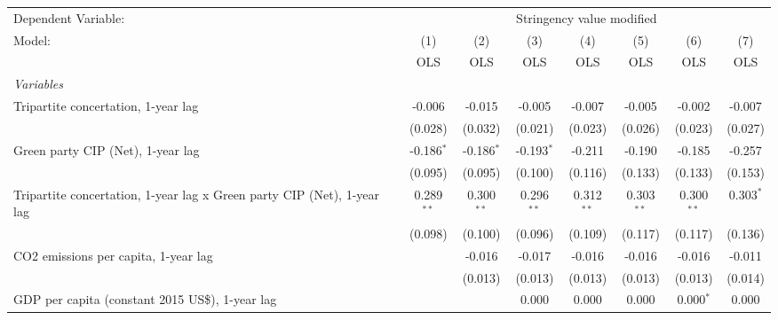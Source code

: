 
\begingroup
\centering
\begin{tabular}{lccccccc}
   \toprule
   Dependent Variable: & \multicolumn{7}{c}{Stringency value modified}\\
   Model:                                                                  & (1)          & (2)          & (3)          & (4)          & (5)          & (6)          & (7)\\  
                                                                           &  OLS         & OLS          & OLS          & OLS          & OLS          & OLS          & OLS\\  
   \midrule
   \emph{Variables}\\
   Tripartite concertation, 1-year lag                                     & -0.006       & -0.015       & -0.005       & -0.007       & -0.005       & -0.002       & -0.007\\   
                                                                           & (0.028)      & (0.032)      & (0.021)      & (0.023)      & (0.026)      & (0.023)      & (0.027)\\   
   Green party CIP (Net), 1-year lag                                       & -0.186$^{*}$ & -0.186$^{*}$ & -0.193$^{*}$ & -0.211       & -0.190       & -0.185       & -0.257\\   
                                                                           & (0.095)      & (0.095)      & (0.100)      & (0.116)      & (0.133)      & (0.133)      & (0.153)\\   
   Tripartite concertation, 1-year lag x Green party CIP (Net), 1-year lag & 0.289$^{**}$ & 0.300$^{**}$ & 0.296$^{**}$ & 0.312$^{**}$ & 0.303$^{**}$ & 0.300$^{**}$ & 0.303$^{*}$\\   
                                                                           & (0.098)      & (0.100)      & (0.096)      & (0.109)      & (0.117)      & (0.117)      & (0.136)\\   
   CO2 emissions per capita, 1-year lag                                    &              & -0.016       & -0.017       & -0.016       & -0.016       & -0.016       & -0.011\\   
                                                                           &              & (0.013)      & (0.013)      & (0.013)      & (0.013)      & (0.013)      & (0.014)\\   
   GDP per capita (constant 2015 US\$), 1-year lag                         &              &              & 0.000        & 0.000        & 0.000        & 0.000$^{*}$  & 0.000\\   

\end{tabular}
